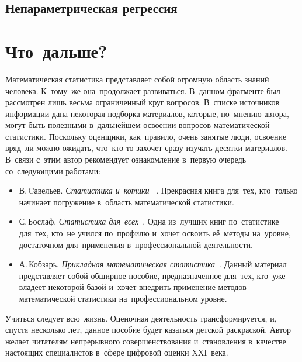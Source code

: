 \documentclass[]{scrartcl}
\begin{document}
\subsection{Непараметрическая регрессия}







\section{Что~дальше?}
Математическая статистика представляет собой огромную область знаний человека. К~тому~же она~продолжает развиваться. В~данном фрагменте был рассмотрен лишь весьма ограниченный круг вопросов. В~списке источников информации дана некоторая подборка материалов, которые, по~мнению автора, могут быть полезными в~дальнейшем освоении вопросов математической статистики. Поскольку оценщики, как~правило, очень занятые люди, освоение вряд~ли можно ожидать, что~кто-то захочет сразу изучать десятки материалов. В~связи с~этим автор рекомендует ознакомление в~первую очередь со~следующими работами:
	\begin{itemize}
		\item В.\,Cавельев. \emph{Статистика и~котики} ~\cite{Statistika-i-kotiki}. Прекрасная книга для~тех, кто~только начинает погружение в~область математической статистики.
		\item С.\,Бослаф. \emph{Статистика для~всех}~\cite{Statistika-dlya-vsex}. Одна из~лучших книг по~статистике для~тех, кто~не учился по~профилю и~хочет освоить её~методы на~уровне, достаточном для~применения в~профессиональной деятельности.
		\item А.\,Кобзарь. \emph{Прикладная математическая статистика}~\cite{Kobzarq-prikl-mathstat}. Данный материал представляет собой обширное пособие, предназначенное для~тех, кто~уже владеет некоторой базой и~хочет внедрить применение методов математической статистики на~профессиональном уровне.     
	\end{itemize}  

Учиться следует всю~жизнь. Оценочная деятельность трансформируется, и, спустя несколько лет, данное пособие будет казаться детской раскраской. Автор желает читателям непрерывного совершенствования и~становления в~качестве настоящих специалистов в~сфере цифровой оценки XXI~века.

\nocite{Statistika-i-kotiki, Xalqman:Regression-analiz, Baraz:KRA, GOST:Tochnostq-izmerenij-1, GOST:Statmetody, GOST:Statterminy, Stepik:osnovy-statistiki-1, Stepik:osnovy-statistiki-2, Stepik:osnovy-statistiki-3, Teorver-v-uduvolqstvie, CSC:la, CSC:teoriya-grafov, CSC:mathstat-1, CSC:diskt-math, CSC:matan-1, CSC:matan-2, CSC:teorver, CSC:vvedenie-v-matan, Statostika-dlya-gum, Stat-radiosignal, Sprav:mathstat, Math-mod-Kazanczeva, Statistika-dlya-vsex, Veroyatnosty-i-mathstat-Encz, Kobzarq-prikl-mathstat, N-hist, Stat-vyvody-i-svyazi, ITMO:statistika, Drejper-Smith:prikl-regr-analiz, Ajwazyan-prikl-stat, Shixalyyow-Regr-an-par-regr, Biznes-analiz-informaczii:statmetody}

\printbibliography[title=Источники информации]
\end{document}

